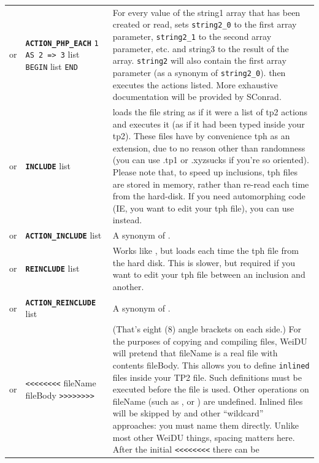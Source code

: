 \documentclass{article}
\def\ttref#1{\ahrefloc{#1}{\tt #1}}
\def\DEFINE#1{{\tt \bf #1}\label{#1}\index{#1}}
\def\t#1{{\tt #1}}
\def\Slist{{\color{red} list }}
\begin{document}
\begin{tabular}{cp{10in}|p{10in}}
or & \DEFINE{ACTION_PHP_EACH} \t{\ttref{String}1 AS \ttref{String}2 => \ttref{String}3} \Slist
                              \t{BEGIN} \ttref{TP2 Action} \Slist \t{END} &
    For every value of the string1 array that has been created or read, sets
    \verb+string2_0+ to the first array parameter, \verb+string2_1+ to the second array
    parameter, etc. and string3 to the result of the array. \verb+string2+ will also contain
		the first array parameter (as a synonym of \verb+string2_0+). then executes the
    actions listed. More exhaustive documentation will be provided by SConrad.
\\

or & \DEFINE{INCLUDE} \t{\ttref{String}} \Slist &
    loads the file string as if it were a list of tp2 actions and executes it (as if
		it had been typed inside your tp2).
    These files have by convenience tph as an extension, due to no reason other than
    randomness (you can use .tp1 or .xyzsucks if you're so oriented).
		Please note that, to speed up inclusions, tph files are stored in memory,
	  rather than re-read each time from the hard-disk. If you need automorphing code
		(IE, you want to edit your tph file), you can use \ttref{REINCLUDE} instead. \\
or & \DEFINE{ACTION_INCLUDE} \t{\ttref{String}} \Slist &
    A synonym of \ttref{INCLUDE}.
\\
or & \DEFINE{REINCLUDE} \t{\ttref{String}} \Slist &
    Works like \ttref{INCLUDE}, but loads each time the tph file from the hard disk.
    This is slower, but required if you want to edit your tph file between an
    inclusion and another.
    \\
or & \DEFINE{ACTION_REINCLUDE} \t{\ttref{String}} \Slist &
    A synonym of \ttref{REINCLUDE}.
    \\
  or & \t{<<<<<<<<} fileName fileBody \t{>>>>>>>>}\index{inlined}\label{inlined} &
    (That's eight (8) angle brackets on each side.)
    For the purposes of copying and compiling files, WeiDU will pretend
    that fileName is a real file with contents fileBody. This allows you to
    define \t{inlined} files inside your TP2 file. Such definitions
    must be executed before the \ttref{inlined} file is used. Other operations
    on fileName (such as \ttref{FILE_EXISTS}, \ttref{FILE_MD5} or
    \ttref{FILE_SIZE}) are undefined. Inlined files will be skipped by
    \ttref{COPY_EXISTING_REGEXP} and other ``wildcard'' approaches: you
    must name them directly. Unlike most other WeiDU things,
    spacing matters here. After the initial \t{<<<<<<<<} there can be

\end{tabular}
\end{document}
